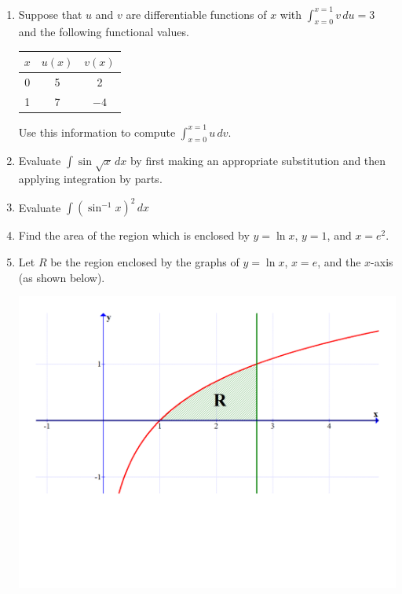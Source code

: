 \documentclass[12pt]{article}
\newif\ifans
\begin{document}
\begin{enumerate}
\ifans{\fbox{$e-2$}} \fi

\item Suppose that $u$ and $v$ are differentiable functions of $x$ with $\int_{x=0}^{x=1} v \,du = 3$ and the following functional values.\\
\begin{center}
\begin{tabular}{|c|c|c|}
\hline
$x$ & $u(x)$ & $v(x)$\\
\hline
0 & 5 & 2 \\
\hline
1 & 7 & $-4$\\
\hline
\end{tabular}
\end{center}
Use this information to compute $\int_{x=0}^{x=1} u \,dv$.

\ifans{\fbox{$-41$}} \fi

\item Evaluate $\int \sin{\sqrt{x}} \,dx$ by first making an appropriate substitution and then applying integration by parts.

\ifans{\fbox{$2\sin{(\sqrt{x})}-2\sqrt{x}\cos{(\sqrt{x})}+C$}} \fi

\item Evaluate $\int \left(\sin^{-1}x\right)^2 \,dx$

\ifans{\fbox{$x\left(\sin^{-1}x\right)^2-2x+2\sqrt{1-x^2}\left(\sin^{-1}x\right)+C$}} \fi

\item Find the area of the region which is enclosed by $y=\ln{x}$, $y=1$, and $x=e^2$.

\ifans{\fbox{$e$}} \fi

\item Let $R$ be the region enclosed by the graphs of $y=\ln{x}$, $x=e$, and the $x$-axis (as shown below).

\begin{center}
\includegraphics[scale=0.38]{volume2.pdf}
\end{center}


\end{enumerate}
\end{document}
